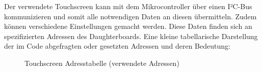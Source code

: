 Der verwendete Touchscreen kann mit dem Mikrocontroller über einen I²C-Bus kommunizieren und somit alle notwendigen Daten an diesen übermitteln.
Zudem können verschiedene Einstellungen gemacht werden.
Diese Daten finden sich an spezifizierten Adressen des Daughterboards.
Eine kleine tabellarische Darstellung der im Code abgefragten oder gesetzten Adressen und deren Bedeutung:
\medskip
\begin{figure}[h!]
	\centering
	
	
	\caption{Touchscreen Adresstabelle (verwendete Adressen)}
	\label{ts-address_table}
\end{figure}
